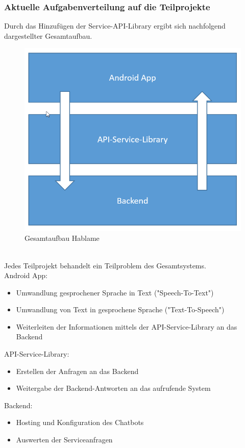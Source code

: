 \subsubsection{Aktuelle Aufgabenverteilung auf die Teilprojekte}
Durch das Hinzufügen der Service-API-Library ergibt sich nachfolgend dargestellter Gesamtaufbau.\\
\begin{figure}[h]
	\centering
	\includegraphics[width=0.7\linewidth]{ks/graphics/arch.png}
	\caption{Gesamtaufbau Hablame}
	\label{fig:arch}
\end{figure}\\
Jedes Teilprojekt behandelt ein Teilproblem des Gesamtsystems.\\
Android App:
\begin{itemize}\itemsep0pt
	\item Umwandlung gesprochener Sprache in Text ("Speech-To-Text")
	\item Umwandlung von Text in gesprochene Sprache ("Text-To-Speech")
	\item Weiterleiten der Informationen mittels der API-Service-Library an das Backend
\end{itemize}
API-Service-Library:
\begin{itemize}
	\item Erstellen der Anfragen an das Backend
	\item Weitergabe der Backend-Antworten an das aufrufende System
\end{itemize}
Backend:
\begin{itemize}
	\item Hosting und Konfiguration des Chatbots
	\item Auswerten der Serviceanfragen
\end{itemize}

